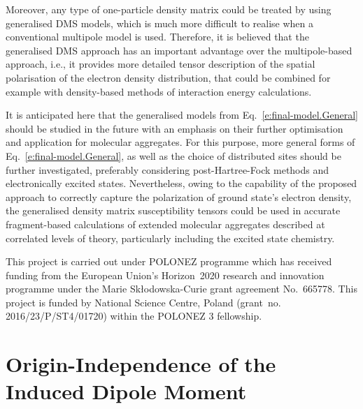 \documentclass[aip,amsmath,amssymb,reprint,floatfix]{revtex4-1}
\newcommand*{\InlineImage}[1]{%
    \raisebox{-.02\baselineskip}{%
        \texttt{[image: \#1]}%
    }%
}
\begin{document}
Moreover, any type of one\hyp{}particle density matrix could be treated by using
generalised DMS models, which is much more difficult to realise when a conventional multipole
model is used.
Therefore, it is believed that
the generalised DMS approach
has an important advantage over the multipole\hyp{}based approach, i.e., it provides more detailed
tensor description of the spatial polarisation of the electron density distribution, that could be
combined for example with density\hyp{}based methods of interaction energy calculations.\cite{Mandado.Hermida-Ramon.JCTC.2011}

It is anticipated here that the generalised models from Eq.~\eqref{e:final-model.General}
should be studied in the future with an emphasis 
on their further optimisation and application for molecular aggregates.
For this purpose, more general forms of Eq.~\eqref{e:final-model.General}, as well as the choice of distributed
sites should be further investigated, preferably considering post\hyp{}Hartree\hyp{}Fock methods
and electronically excited states.
Nevertheless, owing to the capability of the proposed approach to correctly capture the 
polarization of ground state's electron density,
the generalised density matrix susceptibility tensors 
could be used in accurate fragment\hyp{}based calculations of extended molecular aggregates
described at correlated levels of theory, particularly including the excited state chemistry.

\begin{acknowledgments}
This project is carried out under POLONEZ programme which has received funding from the European Union's
Horizon~2020 research and innovation programme under the Marie Skłodowska-Curie grant agreement 
No.~665778. \InlineImage{eu-logo.eps} This project is funded by National Science Centre, Poland 
(grant~no. 2016/23/P/ST4/01720) within the POLONEZ 3 fellowship. 
\end{acknowledgments}

%
\appendix

\section{\label{a:orig-dep} Origin-Independence of the Induced Dipole Moment}
\end{document}
